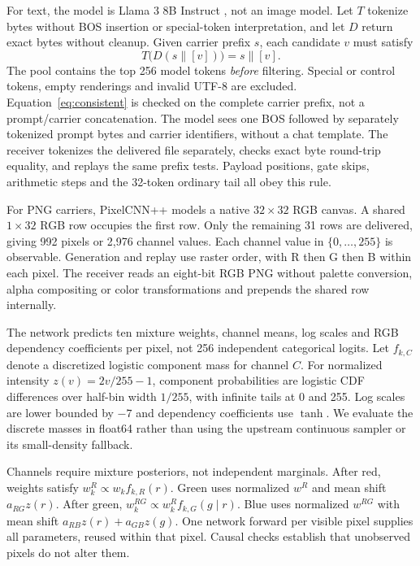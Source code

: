 For text, the model is Llama 3 8B Instruct \cite{llama3}, not an image model. Let $T$ tokenize bytes without BOS insertion or special-token interpretation, and let $D$ return exact bytes without cleanup. Given carrier prefix $s$, each candidate $v$ must satisfy
\begin{equation}
T\bigl(D(s\mathbin{\|}[v])\bigr)=s\mathbin{\|}[v].
\label{eq:consistent}
\end{equation}
The pool contains the top 256 model tokens \emph{before} filtering. Special or control tokens, empty renderings and invalid UTF-8 are excluded. Equation~\ref{eq:consistent} is checked on the complete carrier prefix, not a prompt/carrier concatenation. The model sees one BOS followed by separately tokenized prompt bytes and carrier identifiers, without a chat template. The receiver tokenizes the delivered file separately, checks exact byte round-trip equality, and replays the same prefix tests. Payload positions, gate skips, arithmetic steps and the 32-token ordinary tail all obey this rule.

For PNG carriers, PixelCNN++ \cite{pixelcnn} models a native $32\times32$ RGB canvas. A shared $1\times32$ RGB row occupies the first row. Only the remaining 31 rows are delivered, giving 992 pixels or 2,976 channel values. Each channel value in $\{0,\ldots,255\}$ is observable. Generation and replay use raster order, with R then G then B within each pixel. The receiver reads an eight-bit RGB PNG without palette conversion, alpha compositing or color transformations and prepends the shared row internally.

The network predicts ten mixture weights, channel means, log scales and RGB dependency coefficients per pixel, not 256 independent categorical logits. Let $f_{k,C}$ denote a discretized logistic component mass for channel $C$. For normalized intensity $z(v)=2v/255-1$, component probabilities are logistic CDF differences over half-bin width $1/255$, with infinite tails at 0 and 255. Log scales are lower bounded by $-7$ and dependency coefficients use $\tanh$. We evaluate the discrete masses in float64 rather than using the upstream continuous sampler or its small-density fallback.

Channels require mixture posteriors, not independent marginals. After red, weights satisfy $w_k^R\propto w_k f_{k,R}(r)$. Green uses normalized $w^R$ and mean shift $a_{RG}z(r)$. After green, $w_k^{RG}\propto w_k^R f_{k,G}(g\mid r)$. Blue uses normalized $w^{RG}$ with mean shift $a_{RB}z(r)+a_{GB}z(g)$. One network forward per visible pixel supplies all parameters, reused within that pixel. Causal checks establish that unobserved pixels do not alter them.

